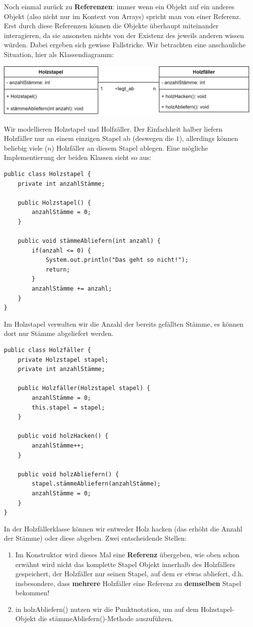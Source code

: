 \documentclass[fontsize=12pt]{article}
\begin{document}
Noch einmal zurück zu \textbf{Referenzen}: immer wenn ein Objekt auf ein anderes Objekt  (also nicht nur im Kontext von Arrays) spricht man von einer Referenz. Erst durch diese Referenzen können die Objekte überhaupt miteinander interagieren, da sie ansonsten nichts von der Existenz des jeweils anderen wissen würden. Dabei ergeben sich gewisse Fallstricke. Wir betrachten eine anschauliche Situation, hier als Klassendiagramm:
\begin{center}
    \includegraphics[scale=0.2]{media/class_diagram_holz.png}
\end{center} 
Wir modellieren Holzstapel und Holfzäller. Der Einfachheit halber liefern Holzfäller nur an einem einzigen Stapel ab (deswegen die $1$), allerdings können beliebig viele ($n$) Holzfäller an diesem Stapel ablegen. Eine mögliche Implementierung der beiden Klassen sieht so aus: 
\begin{verbatim}
public class Holzstapel {
    private int anzahlStämme;
    
    public Holzstapel() {
        anzahlStämme = 0;
    }
    
    public void stämmeAbliefern(int anzahl) {
        if(anzahl <= 0) {
            System.out.println("Das geht so nicht!");
            return;
        }
        anzahlStämme += anzahl;
    }
}
\end{verbatim}
Im Holzstapel verwalten wir die Anzahl der bereits gefällten Stämme, es können dort nur Stämme abgeliefert werden. 
\begin{verbatim}
public class Holzfäller {
    private Holzstapel stapel;
    private int anzahlStämme;
    
    public Holzfäller(Holzstapel stapel) {
        anzahlStämme = 0;
        this.stapel = stapel;
    }
    
    public void holzHacken() {
        anzahlStämme++;
    }
    
    public void holzAbliefern() {
        stapel.stämmeAbliefern(anzahlStämme);
        anzahlStämme = 0;
    }
}
\end{verbatim}
In der Holzfällerklasse können wir entweder Holz hacken (das erhöht die Anzahl der Stämme) oder diese abgeben. Zwei entscheidende Stellen:
\begin{enumerate}
    \item Im Konstruktor wird dieses Mal eine \textbf{Referenz} übergeben, wie oben schon erwähnt wird nicht das komplette Stapel Objekt innerhalb des Holzfällers gespeichert, der Holzfäller  nur seinen Stapel, auf dem er etwas abliefert, d.h. insbesondere, dass \textbf{mehrere} Holzfäller eine Referenz zu \textbf{demselben} Stapel bekommen!
    \item in holzAbliefern() nutzen wir die Punktnotation, um auf dem Holzstapel-Objekt die stämmeAbliefern()-Methode auszuführen. 
\end{enumerate}
\end{document}
